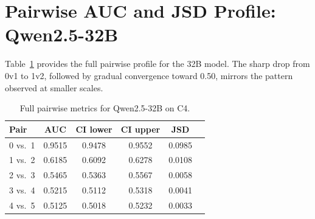 \documentclass[11pt,a4paper]{article}
\begin{document}
\section{Pairwise AUC and JSD Profile: Qwen2.5-32B}
\label{app:32b_detail}

Table~\ref{tab:32b_detail} provides the full pairwise profile for the 32B model. The sharp drop from 0v1 to 1v2, followed by gradual convergence toward 0.50, mirrors the pattern observed at smaller scales.

\begin{table}[h]
\centering
\small
\caption{Full pairwise metrics for Qwen2.5-32B on C4.}
\label{tab:32b_detail}
\begin{tabular}{lccccc}
\toprule
\textbf{Pair} & \textbf{AUC} & \textbf{CI lower} & \textbf{CI upper} & \textbf{JSD} \\
\midrule
0 vs.\ 1 & 0.9515 & 0.9478 & 0.9552 & 0.0985 \\
1 vs.\ 2 & 0.6185 & 0.6092 & 0.6278 & 0.0108 \\
2 vs.\ 3 & 0.5465 & 0.5363 & 0.5567 & 0.0058 \\
3 vs.\ 4 & 0.5215 & 0.5112 & 0.5318 & 0.0041 \\
4 vs.\ 5 & 0.5125 & 0.5018 & 0.5232 & 0.0033 \\
\bottomrule
\end{tabular}
\end{table}


\end{document}
